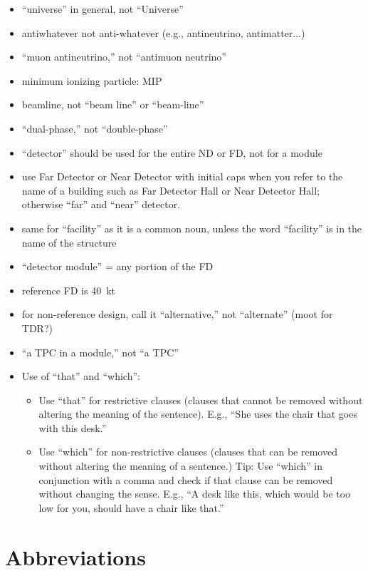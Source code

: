 \begin{itemize}
\item ``universe'' in general, not ``Universe''
\item antiwhatever not anti-whatever (e.g., antineutrino, antimatter...)
\item ``muon antineutrino,'' not ``antimuon neutrino''
\item minimum ionizing particle: MIP
\item beamline, not ``beam line'' or ``beam-line''
\item ``dual-phase,'' not ``double-phase''
\item ``detector'' should be used for the entire ND or FD, not for a module
\item use Far Detector or Near Detector with initial caps when you refer to the name of a building such as Far Detector Hall or Near Detector Hall; otherwise ``far'' and ``near'' detector.
\item same for ``facility'' as it is a common noun, unless the word ``facility'' is in the name of the structure
\item ``detector module'' = any  portion of the FD
\item reference FD is \SI{40}{kt}
\item for non-reference design, call it ``alternative,'' not ``alternate'' (moot for TDR?)
\item ``a TPC in a  module,'' not ``a   TPC'' 
\item Use of ``that'' and ``which'': 
\begin{itemize}
\item Use ``that'' for restrictive clauses (clauses that cannot be removed without altering the meaning of the sentence). E.g., ``She uses the chair that goes with this desk.''
\item Use ``which'' for non-restrictive clauses (clauses that can be removed without altering the meaning of a sentence.) Tip: Use ``which'' in conjunction with a comma and check if that clause can be removed without changing the sense.  E.g., ``A desk like this, which would be too low for you, should have a chair like that.''
\end{itemize}
\end{itemize}

\section{Abbreviations}
\label{sec:english-abbrevs}

